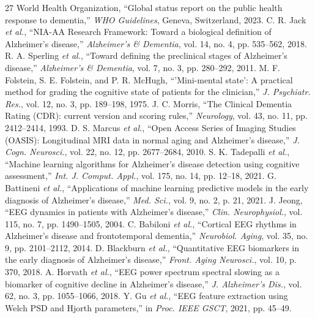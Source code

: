 \documentclass[conference]{IEEEtran}
\begin{document}
\begin{thebibliography}{27}
 World Health Organization, ``Global status report on the public health response to dementia,'' \textit{WHO Guidelines}, Geneva, Switzerland, 2023.
 C. R. Jack \textit{et al.}, ``NIA-AA Research Framework: Toward a biological definition of Alzheimer's disease,'' \textit{Alzheimer's \& Dementia}, vol. 14, no. 4, pp. 535--562, 2018.
 R. A. Sperling \textit{et al.}, ``Toward defining the preclinical stages of Alzheimer's disease,'' \textit{Alzheimer's \& Dementia}, vol. 7, no. 3, pp. 280--292, 2011.
 M. F. Folstein, S. E. Folstein, and P. R. McHugh, ``'Mini-mental state': A practical method for grading the cognitive state of patients for the clinician,'' \textit{J. Psychiatr. Res.}, vol. 12, no. 3, pp. 189--198, 1975.
 J. C. Morris, ``The Clinical Dementia Rating (CDR): current version and scoring rules,'' \textit{Neurology}, vol. 43, no. 11, pp. 2412--2414, 1993.
 D. S. Marcus \textit{et al.}, ``Open Access Series of Imaging Studies (OASIS): Longitudinal MRI data in normal aging and Alzheimer's disease,'' \textit{J. Cogn. Neurosci.}, vol. 22, no. 12, pp. 2677--2684, 2010.
 S. K. Tadepalli \textit{et al.}, ``Machine learning algorithms for Alzheimer's disease detection using cognitive assessment,'' \textit{Int. J. Comput. Appl.}, vol. 175, no. 14, pp. 12--18, 2021.
 G. Battineni \textit{et al.}, ``Applications of machine learning predictive models in the early diagnosis of Alzheimer's disease,'' \textit{Med. Sci.}, vol. 9, no. 2, p. 21, 2021.
 J. Jeong, ``EEG dynamics in patients with Alzheimer's disease,'' \textit{Clin. Neurophysiol.}, vol. 115, no. 7, pp. 1490--1505, 2004.
 C. Babiloni \textit{et al.}, ``Cortical EEG rhythms in Alzheimer's disease and frontotemporal dementia,'' \textit{Neurobiol. Aging}, vol. 35, no. 9, pp. 2101--2112, 2014.
 D. Blackburn \textit{et al.}, ``Quantitative EEG biomarkers in the early diagnosis of Alzheimer's disease,'' \textit{Front. Aging Neurosci.}, vol. 10, p. 370, 2018.
 A. Horvath \textit{et al.}, ``EEG power spectrum spectral slowing as a biomarker of cognitive decline in Alzheimer's disease,'' \textit{J. Alzheimer's Dis.}, vol. 62, no. 3, pp. 1055--1066, 2018.
 Y. Gu \textit{et al.}, ``EEG feature extraction using Welch PSD and Hjorth parameters,'' in \textit{Proc. IEEE GSCT}, 2021, pp. 45--49.

\end{thebibliography}
\end{document}
